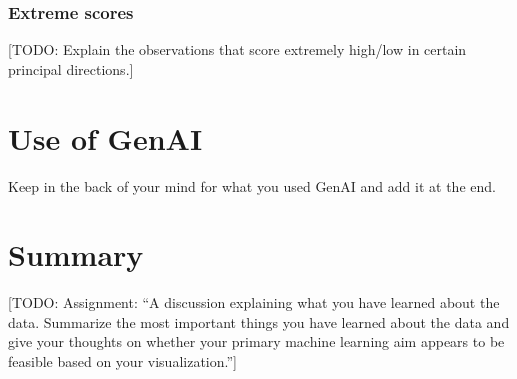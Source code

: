 \documentclass[dtu]{dtuarticle}
\newcommand{\todo}[1]{\color{red}[TODO: #1]\color{black}}
\begin{document}
	\subsubsection{Extreme scores}

	\todo{Explain the observations that score extremely high/low in certain principal directions.}

	\section{Use of GenAI}

	Keep in the back of your mind for what you used GenAI and add it at the end.

	\section*{Summary}

	\todo{Assignment: ``A discussion explaining what you have learned about the data.
		Summarize the most important things you have learned about the data and give your
		thoughts on whether your primary machine learning aim appears to be feasible based on
		your visualization.''}

	
	

%
%

\end{document}

